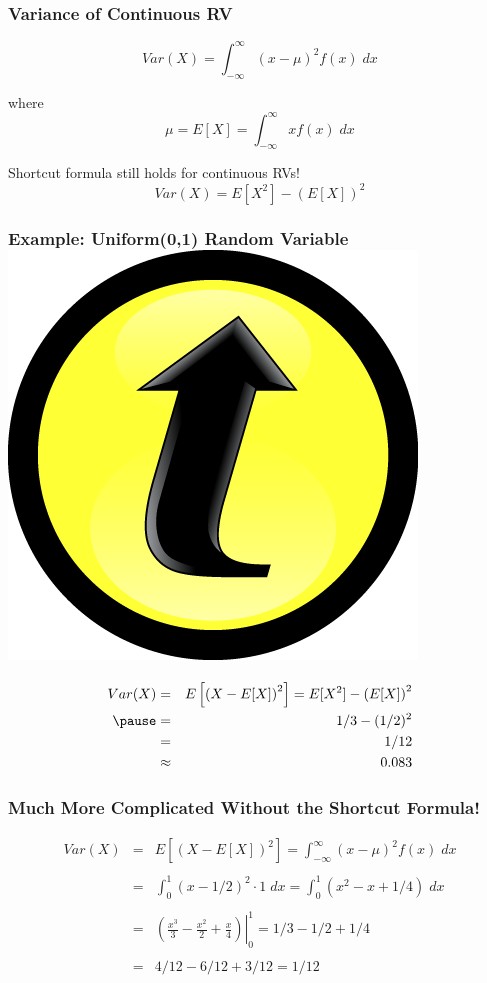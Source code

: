 \documentclass[handout]{beamer}
\begin{document}
\begin{frame}
\frametitle{Variance of Continuous RV}

$$\boxed{Var(X) = \int_{-\infty}^{\infty} (x - \mu)^2 f(x) \; dx}$$

\vspace{2em}
where
$$\mu = E[X]=\int_{-\infty}^\infty x f(x) \; dx $$

\vspace{2em}
\alert{Shortcut formula still holds for continuous RVs!}
	$$Var(X) = E[X^2] - \left(E[X]\right)^2$$
\end{frame}

\begin{frame}
\frametitle{Example: Uniform(0,1) Random Variable \hfill \includegraphics[scale = 0.05]{./images/clicker}}
\begin{eqnarray*}
 Var(X) &=& E\left[ \left( X - E[X] \right)^2\right] = E[X^2] - \left(E[X]\right)^2\\ \pause
 	&=& 1/3  - (1/2)^2\\ 
 	&=& 1/12 \\
 	&\approx& 0.083
\end{eqnarray*}
\end{frame}

\begin{frame}
\frametitle{Much More Complicated Without the Shortcut Formula!}
\begin{eqnarray*}
 Var(X) &=& E\left[ \left( X - E[X] \right)^2\right] = \int_{-\infty}^{\infty} (x - \mu)^2 f(x) \; dx\\ \\
 	&=&\int_{0}^{1} (x -1/2)^2 \cdot 1 \; dx = \int_{0}^{1} (x^2  - x + 1/4) \; dx \\ \\
 		&=& \left. \left(\frac{x^3}{3} - \frac{x^2}{2} + \frac{x}{4}  \right)\right|_0^1 = 1/3 - 1/2 + 1/4\\ \\ 
 			&=& 4/12 - 6/12 + 3/12 = 1/12
\end{eqnarray*}
\end{frame}
\end{document}
